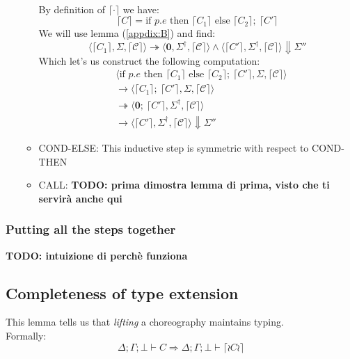 \documentclass[12pt,a4paper,twoside]{book}
\begin{document}
\begin{itemize}
\begin{itemize}
\begin{align}
\end{align}
By definition of $\lceil \cdot \rceil$ we have:
$$
\lceil C\rceil = \text{if } p.e \text{ then } \lceil C_1\rceil \text{ else }\lceil C_2\rceil;~ \lceil C'\rceil
$$
We will use lemma (\ref{appdix:B}) and find:
$$
\langle \lceil C_1 \rceil, \Sigma, \lceil \mathscr{C} \rceil \rangle \twoheadrightarrow \langle \boldsymbol{0}, \Sigma^\dag, \lceil \mathscr{C} \rceil \rangle 
\land
\langle \lceil C' \rceil, \Sigma^\dag, \lceil \mathscr{C} \rceil \rangle \Downarrow \Sigma''
$$
Which let's us construct the following computation:
\begin{align*}
&\langle \text{if } p.e \text{ then } \lceil C_1\rceil \text{ else }\lceil C_2\rceil;~ \lceil C'\rceil, \Sigma, \lceil \mathscr{C}\rceil\rangle\\
&\rightarrow \langle \lceil C_1\rceil;~ \lceil C'\rceil, \Sigma, \lceil \mathscr{C}\rceil\rangle\\
&\twoheadrightarrow \langle \boldsymbol{0};~ \lceil C'\rceil, \Sigma^\dag, \lceil \mathscr{C} \rceil \rangle \\
&\rightarrow \langle \lceil C'\rceil, \Sigma^\dag, \lceil \mathscr{C} \rceil \rangle\Downarrow \Sigma''
\end{align*}
\item COND-ELSE: This inductive step is symmetric with respect to COND-THEN
\item CALL: \textbf{TODO: prima dimostra lemma di prima, visto che ti servirà anche qui}









\end{itemize}
\end{itemize}


\subsubsection{Putting all the steps together}
\textbf{TODO: intuizione di perchè funziona}

\subsection{Completeness of type extension}\label{aux:ext_tj}
This lemma tells us that \emph{lifting} a choreography maintains typing.\\
Formally:
$$
\Delta;\Gamma;\bot \vdash C \Rightarrow
\Delta;\Gamma;\bot \vdash \lceil \wr C \wr \rceil
$$
\end{document}
